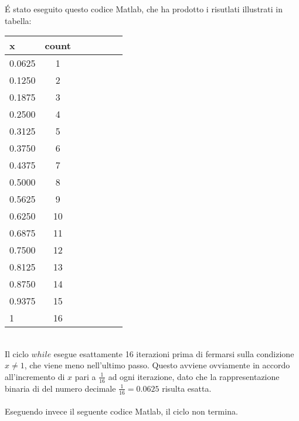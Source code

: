 \begin{center}
\footnotesize\noindent{}\end{center}

\noindent \'E stato eseguito questo codice Matlab, che ha prodotto i risutlati illustrati in tabella:



\begin{tabular}{l*{6}{c}}
 x  &  count \\
\hline
 0.0625 & 1 \\
 0.1250 & 2 \\
 0.1875 & 3 \\
 0.2500 & 4 \\
 0.3125 & 5 \\
 0.3750 & 6 \\
 0.4375 & 7 \\
 0.5000 & 8 \\
 0.5625 & 9 \\
 0.6250 & 10 \\
 0.6875 & 11 \\
 0.7500 & 12 \\
 0.8125 & 13 \\
 0.8750 & 14 \\
 0.9375 & 15 \\
      1 & 16 \\
\end{tabular} \\

\noindent Il ciclo \(while\) esegue esattamente 16 iterazioni prima di fermarsi sulla condizione \(x \neq 1\), che viene meno nell'ultimo passo. Questo avviene ovviamente in accordo all'incremento di \(x\) pari a \(\frac{1}{16}\) ad ogni iterazione, dato che la rappresentazione binaria di del numero decimale \(\frac{1}{16} = 0.0625\) risulta esatta.
\\
\\
\noindent Eseguendo invece il seguente codice Matlab, il ciclo non termina.



